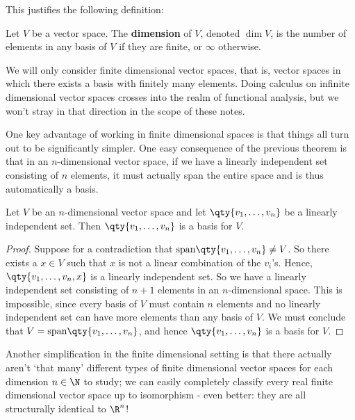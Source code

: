 This justifies the following definition:
\begin{definition}
  Let \( V \) be a vector space. The \textbf{dimension} of \( V \), denoted \( \dim V \), is the number of elements in any basis of \( V \) if they are finite, or \( \infty \) otherwise.
\end{definition}

We will only consider finite dimensional vector spaces, that is, vector spaces in which there exists a basis with finitely many elements. Doing calculus on infinite dimensional vector spaces crosses into the realm of functional analysis, but we won't stray in that direction in the scope of these notes.

\vspace{3mm}

One key advantage of working in finite dimensional spaces is that things all turn out to be significantly simpler. One easy consequence of the previous theorem is that in an \( n \)-dimensional vector space, if we have a linearly independent set consisting of \( n \) elements, it must actually span the entire space and is thus automatically a basis.
\begin{corollary}
  Let \( V \) be an \( n \)-dimensional vector space and let \( \qty{v_1,\dots,v_n} \) be a linearly independent set. Then \( \qty{v_1,\dots,v_n} \) is a basis for \( V \).
\end{corollary}
\begin{proof}
  Suppose for a contradiction that \( \text{span}\qty{v_1,\dots,v_n}\neq V \). So there exists a \( x\in V \) such that \( x \) is not a linear combination of the \( v_i \)'s. Hence, \( \qty{v_1,\dots,v_n,x} \) is a linearly independent set. So we have a linearly independent set consisting of \( n+1 \) elements in an \( n \)-dimensional space. This is impossible, since every basis of \( V \) must contain \( n \) elements and no linearly independent set can have more elements than any basis of \( V \). We must conclude that \( V=\text{span}\qty{v_1,\dots,v_n} \), and hence \( \qty{v_1,\dots,v_n} \) is a basis for \( V \).
\end{proof}

Another simplification in the finite dimensional setting is that there actually aren't `that many' different types of finite dimensional vector spaces for each dimension \( n\in\N \) to study; we can easily completely classify every real finite dimensional vector space up to isomorphism - even better: they are all structurally identical to \( \R^n \)!

